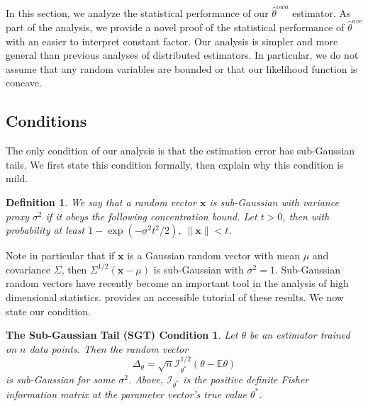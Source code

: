 \documentclass[twoside]{article}
\newtheorem{defn}{Definition}
\newcommand{\E}{\mathbb{E}}
\newcommand{\x}{\mathbf{x}}
\newcommand{\w}{\theta}
\newcommand{\wowa}{\hat\w^{owa}}
\newcommand{\wave}{\hat\w^{ave}}
\newcommand{\wmle}{\hat\w^{mle}}
\newcommand{\wstar}{{\w^{*}}}
\newcommand{\I}{\mathcal I}
\newcommand{\ltwo}[1]{{\lVert {#1} \rVert}}
\newcommand{\ltwobig}[1]{{\left\lVert {#1} \right\rVert}}
\begin{document}
In this section, we analyze the statistical performance of our $\wowa$ estimator.
As part of the analysis, we provide a novel proof of the statistical performance of $\wave$ with an easier to interpret constant factor.
Our analysis is simpler and more general than previous analyses of distributed estimators.
In particular, we do not assume that any random variables are bounded
or that our likelihood function is concave.

\subsection{Conditions}

The only condition of our analysis is that the estimation error has sub-Gaussian tails.
We first state this condition formally,
then explain why this condition is mild.

\begin{defn}
We say that a random vector $\x$ is \emph{sub-Gaussian} with variance proxy $\sigma^2$ if it obeys the following concentration bound.
Let $t>0$, then with probability at least $1-\exp(-\sigma^2t^2/2)$,
$
\ltwo{\x} < t
$.
\end{defn}

Note in particular that if $\x$ is a Gaussian random vector with mean $\mu$ and covariance $\Sigma$,
then $\Sigma^{1/2}(\x-\mu)$ is sub-Gaussian with $\sigma^2=1$.
Sub-Gaussian random vectors have recently become an important tool in the analysis of high dimensional statistics.
\cite{vershynin2010introduction} provides an accessible tutorial of these results.
We now state our condition.

\newtheorem*{sgt}{The Sub-Gaussian Tail (SGT) Condition}
\begin{sgt}
Let $\theta$ be an estimator trained on $n$ data points.
Then the random vector
\begin{equation}
\Delta_\theta = \sqrt{n}{\I^{1/2}_\wstar(\theta-\E\theta)}
\end{equation}
is sub-Gaussian for some $\sigma^2$.
Above, $\I_\wstar$ is the positive definite Fisher information matrix at the parameter vector's true value $\wstar$.
\end{sgt}
\end{document}

